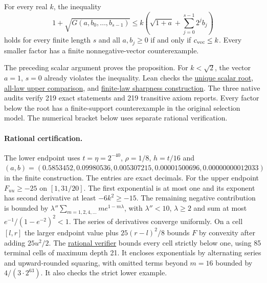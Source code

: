 \begin{proposition}\label{prop:sharp-finite-vector-factor}
For every real $k$, the inequality
\[
 1+\sqrt{G(a,b_0,\ldots,b_{s-1})}
 \le k\left(\sqrt{1+a}+\sum_{j=0}^{s-1}2^jb_j\right)
\]
holds for every finite length $s$ and all $a,b_j\ge0$ if and only if
$c_{\rm vec}\le k$. Every smaller factor has a finite nonnegative-vector
counterexample.
\end{proposition}
The preceding scalar argument proves the proposition. For $k<\sqrt2$,
the vector $a=1$, $s=0$ already violates the inequality.
Lean checks the \href{https://github.com/davidiach/adaptive-threshold-estimation/blob/43a60579395c6b14f33ccd9a23f5e7a928eb843e/lean/ThresholdHC/OptimalQuantile/Root.lean}{unique scalar root},
\href{https://github.com/davidiach/adaptive-threshold-estimation/blob/43a60579395c6b14f33ccd9a23f5e7a928eb843e/lean/ThresholdHC/QuantileSharpLaw/Full.lean}{all-law upper comparison},
and \href{https://github.com/davidiach/adaptive-threshold-estimation/blob/43a60579395c6b14f33ccd9a23f5e7a928eb843e/lean/ThresholdHC/QuantileOptimality/Full.lean}{finite-law sharpness construction}.
The three native audits verify 219 exact statements and 219 transitive
axiom reports. Every factor below the root has a finite-support counterexample
in the original selection model. The numerical bracket below uses separate
rational verification.

\paragraph{Rational certification.}
The lower endpoint uses $t=\eta=2^{-40}$, $\rho=1/8$, $h=t/16$ and
$(a,b)=(0.5853452,0.09980536,0.005307215,0.00001500696,0.00000000012033)$
in the finite construction. The entries are exact decimals.
For the upper endpoint $F_{uu}\ge-25$ on $[1,31/20]$. The first
exponential is at most one and its exponent has second derivative at
least $-6k^2\ge-15$. The remaining negative contribution is bounded by
$\lambda''\sum_{m=1,2,4,\ldots}m e^{1-m\lambda}$, with $\lambda''<10$,
$\lambda\ge2$ and sum at most $e^{-1}/(1-e^{-2})^2<1$. The series of
derivatives converge uniformly. On a cell $[l,r]$ the larger endpoint
value plus $25(r-l)^2/8$ bounds $F$ by convexity after adding $25u^2/2$.
The \href{https://github.com/davidiach/adaptive-threshold-estimation/blob/0555610a84ef201c0c42320d11d1c62e0c8d3588/tools/verify_optimal_quantile_factor.py}{rational verifier}
bounds every cell strictly below one, using 85 terminal cells of maximum
depth 21. It encloses exponentials by alternating series and
upward-rounded squaring, with omitted terms beyond $m=16$ bounded by
$4/(3\cdot2^{63})$. It also checks the strict lower example.
